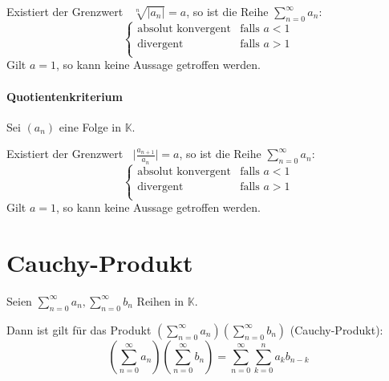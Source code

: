 \documentclass[a4paper, 11pt, accentcolor = tud3b]{tudreport}
\DeclareMathOperator{\liminfty}{\lim _ { n \rightarrow \infty }}
\begin{document}
                Existiert der Grenzwert $ \liminfty \sqrt[n]{\lvert a _ n \rvert} = a $, so ist die Reihe $ \sum _ { n = 0 } ^ \infty a _ n $:
                \begin{equation}
                     \begin{cases}
                        \text{absolut konvergent} & \text{falls } a < 1 \\
                        \text{divergent}          & \text{falls } a > 1 \\
                     \end{cases}
                \end{equation}
                \indent Gilt $ a = 1 $, so kann keine Aussage getroffen werden.

            \paragraph{Quotientenkriterium}
                Sei $ (a _ n) $ eine Folge in $ \mathbb{K} $.

                Existiert der Grenzwert $ \liminfty \lvert \frac{a _ { n + 1 }}{a _ n} \rvert = a $, so ist die Reihe $ \sum _ { n = 0 } ^ \infty a _ n $:
                \begin{equation*}
                     \begin{cases}
                        \text{absolut konvergent} & \text{falls } a < 1 \\
                        \text{divergent}          & \text{falls } a > 1 \\
                     \end{cases}
                \end{equation*}
                \indent Gilt $ a = 1 $, so kann keine Aussage getroffen werden.

        \section{Cauchy-Produkt}
            Seien $ \sum _ { n = 0 } ^ { \infty } a _ n, \sum _ { n = 0 } ^ \infty b _ n $ Reihen in $ \mathbb{K} $.

            Dann ist gilt für das Produkt $ (\sum _ { n = 0 } ^ { \infty } a _ n) (\sum _ { n = 0 } ^ { \infty } b _ n) $ (Cauchy-Produkt):
            \begin{equation*}
                (\sum _ { n = 0 } ^ { \infty } a _ n) (\sum _ { n = 0 } ^ { \infty } b _ n) = \sum _ { n = 0 } ^ \infty \sum _ { k = 0 } ^ n a _ k b _ { n - k }
            \end{equation*}
\end{document}
